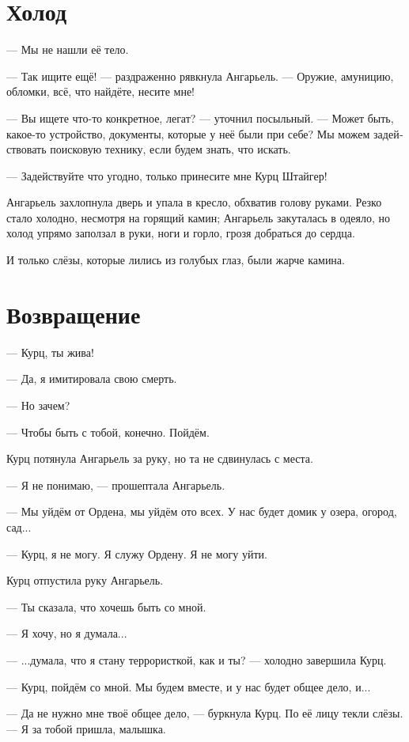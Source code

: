 \documentclass[a4paper,12pt,fleqn]{book}\usepackage{polyglossia}\setdefaultlanguage[babelshorthands=true]{russian}\setotherlanguage{english}\defaultfontfeatures{Ligatures=TeX,Mapping=tex-text}\usepackage{xcolor}\newcommand{\ml}[3]{#2}
\begin{document}
\section{Холод}

--- Мы не нашли её тело.

--- Так ищите ещё! --- раздраженно рявкнула Ангарьель.
--- Оружие, амуницию, обломки, всё, что найдёте, несите мне!

--- Вы ищете что-то конкретное, легат? --- уточнил посыльный.
--- Может быть, какое-то устройство, документы, которые у неё были при себе?
Мы можем задействовать поисковую технику, если будем знать, что искать.

--- Задействуйте что угодно, только принесите мне Курц Штайгер!

Ангарьель захлопнула дверь и упала в кресло, обхватив голову руками.
Резко стало холодно, несмотря на горящий камин;
Ангарьель закуталась в одеяло, но холод упрямо заползал в руки, ноги и горло, грозя добраться до сердца.

И только слёзы, которые лились из голубых глаз, были жарче камина. 

\section{Возвращение}

--- Курц, ты жива!

--- Да, я имитировала свою смерть.

--- Но зачем?

--- Чтобы быть с тобой, конечно.
Пойдём.

Курц потянула Ангарьель за руку, но та не сдвинулась с места.

--- Я не понимаю, --- прошептала Ангарьель.

--- Мы уйдём от Ордена, мы уйдём ото всех.
У нас будет домик у озера, огород, сад...

--- Курц, я не могу.
Я служу Ордену.
Я не могу уйти.

Курц отпустила руку Ангарьель.

--- Ты сказала, что хочешь быть со мной.

--- Я хочу, но я думала...

--- ...думала, что я стану террористкой, как и ты? --- холодно завершила Курц.

--- Курц, пойдём со мной.
Мы будем вместе, и у нас будет общее дело, и...

--- Да не нужно мне твоё общее дело, --- буркнула Курц.
По её лицу текли слёзы.
--- Я за тобой пришла, малышка.
\end{document}
